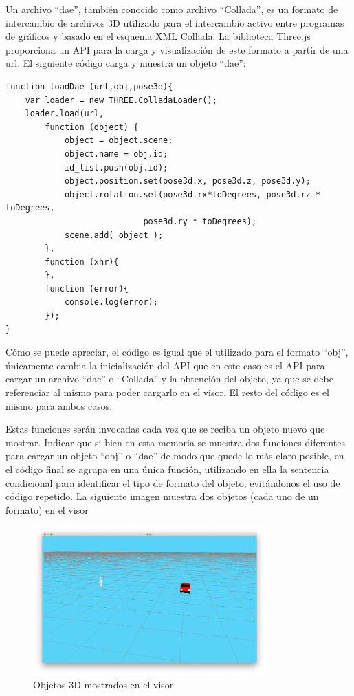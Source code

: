 \begin{itemize}
{Un archivo ``dae'', también conocido como archivo ``Collada'', es un formato de intercambio de archivos 3D utilizado para el intercambio activo entre programas de gráficos y basado en el esquema XML Collada. La biblioteca Three.js proporciona un API para la carga y visualización de este formato a partir de una url. El siguiente código carga y muestra un objeto ``dae'':
\begin{lstlisting}[frame=single]
function loadDae (url,obj,pose3d){
	var loader = new THREE.ColladaLoader();
	loader.load(url, 
		function (object) {
			object = object.scene;
			object.name = obj.id;
			id_list.push(obj.id);
			object.position.set(pose3d.x, pose3d.z, pose3d.y);
			object.rotation.set(pose3d.rx*toDegrees, pose3d.rz * toDegrees, 
							pose3d.ry * toDegrees);
			scene.add( object );		
		},
		function (xhr){
		},
		function (error){
			console.log(error);
		});
}
\end{lstlisting}
Cómo se puede apreciar, el código es igual que el utilizado para el formato ``obj'', únicamente cambia la inicialización del API que en este caso es el API para cargar un archivo ``dae'' o ``Collada'' y la obtención del objeto, ya que se debe referenciar al mismo para poder cargarlo en el visor. El resto del código es el mismo para ambos casos.}
\end{itemize}
Estas funciones serán invocadas cada vez que se reciba un objeto nuevo que mostrar. Indicar que si bien en esta memoria se muestra dos funciones diferentes para cargar un objeto ``obj'' o ``dae'' de modo que quede lo más claro posible, en el código final se agrupa en una única función, utilizando en ella la sentencia condicional para identificar el tipo de formato del objeto, evitándonos el uso de código repetido. La siguiente imagen muestra dos objetos (cada uno de un formato) en el visor

\begin{figure}[H]
  \begin{center}
    \includegraphics[width=0.8\textwidth]{figures/visualizarmodel.png}
		\caption{Objetos 3D mostrados en el visor}
		\label{fig.visualizarmodel}
		\end{center}
\end{figure}
